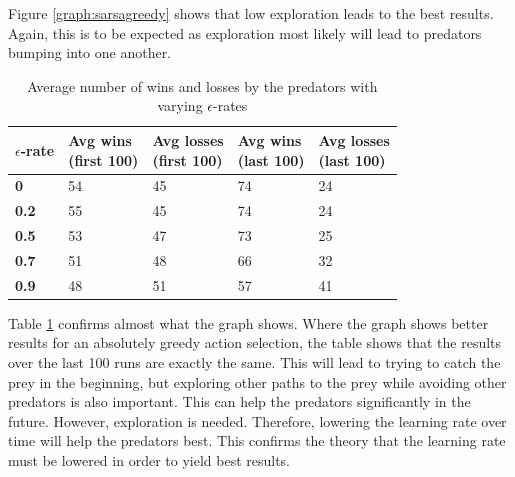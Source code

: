 Figure \ref{graph:sarsagreedy} shows that low exploration leads to the best results. Again, this is to be expected as exploration most likely will lead to predators bumping into one another.

\begin{table}[H]
\begin{center}
\begin{tabular}{| l | l | l | l | l |}
\hline
\parbox{2cm}{\textbf{$\epsilon$-rate}} & \parbox{2cm}{\textbf{Avg wins \\ (first 100)}} & \parbox{2cm}{\textbf{Avg losses \\ (first 100)}} & \parbox{2cm}{\textbf{Avg wins \\ (last 100)}} & \parbox{2cm}{\textbf{Avg losses \\ (last 100)}} \\
\hline
\textbf{0} & 54 & 45 & 74 & 24 \\
\hline
\textbf{0.2} & 55 & 45 & 74 & 24 \\
\hline
\textbf{0.5} & 53 & 47 & 73 & 25 \\
\hline
\textbf{0.7} & 51 & 48 & 66 & 32 \\
\hline
\textbf{0.9} & 48 & 51 & 57 & 41 \\
\hline
\end{tabular}
\caption{Average number of wins and losses by the predators with varying $\epsilon$-rates}
\label{table:sarsagreedy}
\end{center}
\end{table}

Table \ref{table:sarsagreedy} confirms almost what the graph shows. Where the graph shows better results for an absolutely greedy action selection, the table shows that the results over the last 100 runs are exactly the same.  This will lead to trying to catch the prey in the beginning, but exploring other paths to the prey while avoiding other predators is also important. This can help the predators significantly in the future. However, exploration is needed. Therefore, lowering the learning rate over time will help the predators best. This confirms the theory that the learning rate must be lowered in order to yield best results.